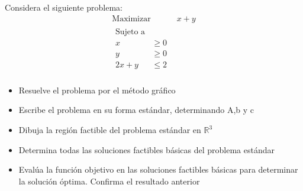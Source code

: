 \documentclass{article}
\begin{document}
Considera el siguiente problema:
\begin{equation*}
  \begin{aligned}
    \text{Maximizar}\quad & x+y\\
    \begin{aligned}
      \text{Sujeto a}& \quad\\
      x & \geq 0\\
      y & \geq 0\\
      2x+y & \leq 2\\
    \end{aligned}
    \end{aligned}
  \end{equation*}
  \begin{itemize}
  \item Resuelve el problema por el método gráfico
  \item Escribe el problema en su forma estándar, determinando A,b y c
  \item Dibuja la región factible del problema estándar en $\mathbb{R}^3$
  \item Determina todas las soluciones factibles básicas del problema estándar
  \item Evalúa la función objetivo en las soluciones factibles básicas para determinar la solución óptima. Confirma el resultado anterior 
  \end{itemize}
  
\end{document}
